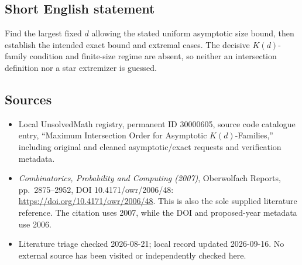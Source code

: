 \documentclass[11pt]{article}
\begin{document}
\subsection{Short English statement}
Find the largest fixed \(d\) allowing the stated uniform asymptotic size bound, then establish the intended exact bound and extremal cases. The decisive \(K(d)\)-family condition and finite-size regime are absent, so neither an intersection definition nor a star extremizer is guessed.
\subsection{Sources}
\begin{itemize}
\item Local UnsolvedMath registry, permanent ID 30000605, source code catalogue entry, ``Maximum Intersection Order for Asymptotic \(K(d)\)-Families,'' including original and cleaned asymptotic/exact requests and verification metadata.
\item \emph{Combinatorics, Probability and Computing (2007)}, Oberwolfach Reports, pp.\ 2875--2952, DOI 10.4171/owr/2006/48: \url{https://doi.org/10.4171/owr/2006/48}. This is also the sole supplied literature reference. The citation uses 2007, while the DOI and proposed-year metadata use 2006.
\item Literature triage checked 2026-08-21; local record updated 2026-09-16. No external source has been visited or independently checked here.
\end{itemize}
\end{document}
